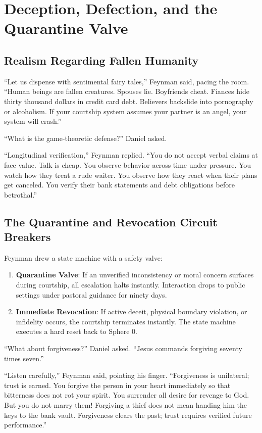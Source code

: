 \documentclass[11pt]{report}
\begin{document}
\chapter{Deception, Defection, and the Quarantine Valve}

\section{Realism Regarding Fallen Humanity}
``Let us dispense with sentimental fairy tales,'' Feynman said, pacing the room. ``Human beings are fallen creatures. Spouses lie. Boyfriends cheat. Fiances hide thirty thousand dollars in credit card debt. Believers backslide into pornography or alcoholism. If your courtship system assumes your partner is an angel, your system will crash.''

``What is the game-theoretic defense?'' Daniel asked.

``Longitudinal verification,'' Feynman replied. ``You do not accept verbal claims at face value. Talk is cheap. You observe behavior across time under pressure. You watch how they treat a rude waiter. You observe how they react when their plans get canceled. You verify their bank statements and debt obligations before betrothal.''

\section{The Quarantine and Revocation Circuit Breakers}
Feynman drew a state machine with a safety valve:
\begin{enumerate}
    \item \textbf{Quarantine Valve}: If an unverified inconsistency or moral concern surfaces during courtship, all escalation halts instantly. Interaction drops to public settings under pastoral guidance for ninety days.
    \item \textbf{Immediate Revocation}: If active deceit, physical boundary violation, or infidelity occurs, the courtship terminates instantly. The state machine executes a hard reset back to Sphere 0.
\end{enumerate}

``What about forgiveness?'' Daniel asked. ``Jesus commands forgiving seventy times seven.''

``Listen carefully,'' Feynman said, pointing his finger. ``Forgiveness is unilateral; trust is earned. You forgive the person in your heart immediately so that bitterness does not rot your spirit. You surrender all desire for revenge to God. But you do not marry them! Forgiving a thief does not mean handing him the keys to the bank vault. Forgiveness clears the past; trust requires verified future performance.''
\end{document}
